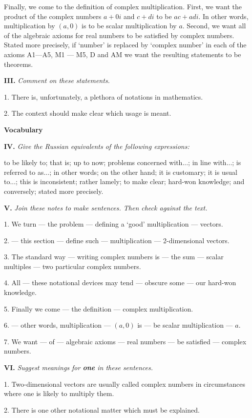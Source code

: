 \documentclass[a4paper]{article}
\newcommand{\ESect}[1]{\medskip\par{\large \textbf{#1}}\par}
\newcommand{\ETask}[2]{\medskip\par\textbf{#1.} \textit{#2}\par}
\begin{document}
Finally, we come to the definition of complex multiplication. First, we want the product of the complex numbers $a + 0i$ and
$c+di$ to be $ac+adi$. In other words, multiplication by $(a,0)$ is to be scalar multiplication by $a$. Second, we want all of
the algebraic axioms for real numbers to be satisfied by complex numbers. Stated more precisely, if `number' is replaced by
`complex number' in each of the axioms A1---A5, M1 --- M5, D and AM we want the resulting statements to be theorems.

\ETask{III}{Comment on these statements.}

1. There is, unfortunately, a plethora of notations in mathematics.

2. The context should make clear which usage is meant.

\ESect{Vocabulary}

\ETask{IV}{Give the Russian equivalents of the following expressions:}
to be likely to; that is; up to now; problems concerned with...; in line with...; is referred to as...; in other words;
on the other hand; it is customary; it is usual to...; this is inconsistent; rather lamely; to make clear; hard-won knowledge;
and conversely; stated more precisely.

\ETask{V}{Join these notes to make sentences. Then check against the text.}

1. We turn --- the problem --- defining a `good' multiplication --- vectors.

2. --- this section --- define such --- multiplication --- 2-dimensional vectors.

3. The standard way --- writing complex numbers is --- the sum --- scalar multiples --- two particular complex numbers.

4. All --- these notational devices may tend --- obscure some --- our hard-won knowledge.

5. Finally we come --- the definition --- complex multiplication.

6. --- other words, multiplication --- $(a,0)$ is --- be scalar multiplication --- $a$.

7. We want --- of --- algebraic axioms --- real numbers --- be satisfied --- complex numbers.

\ETask{VI}{Suggest meanings for \textbf{one} in these sentences.}
1. Two-dimensional vectors are usually called complex numbers in circumstances where one is likely to multiply them.

2. There is one other notational matter which must be explained.
\end{document}
